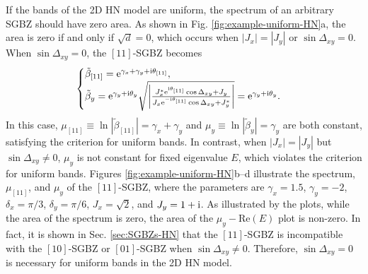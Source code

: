 If the bands of the 2D HN model are uniform, the spectrum of an arbitrary
SGBZ should have zero area. As shown in Fig. \ref{fig:example-uniform-HN}a,
the area is zero if and only if $\sqrt{d}=0$, which occurs when $|J_{x}|=|J_{y}|$
or $\sin\Delta_{xy}=0$. When $\sin\Delta_{xy}=0$, the $[11]$-SGBZ
becomes 
\begin{equation}
\begin{cases}
\tilde{\beta}_{[11]}=\mathrm{e}^{\gamma_{x}+\gamma_{y}+\mathrm{i}\theta_{[11]}},\\
\tilde{\beta}_{y}=\mathrm{e}^{\gamma_{y}+\mathrm{i}\theta_{y}}\sqrt{\left|\frac{J_{x}^{*}\mathrm{e}^{\mathrm{i}\theta_{[11]}}\cos\Delta_{xy}+J_{y}}{J_{x}\mathrm{e}^{-\mathrm{i}\theta_{[11]}}\cos\Delta_{xy}+J_{y}^{*}}\right|}=\mathrm{e}^{\gamma_{y}+\mathrm{i}\theta_{y}}.
\end{cases}
\end{equation}
In this case, $\mu_{[11]}\equiv\ln|\tilde{\beta}_{[11]}|=\gamma_{x}+\gamma_{y}$
and $\mu_{y}\equiv\ln|\tilde{\beta}_{y}|=\gamma_{y}$ are both constant,
satisfying the criterion for uniform bands. In contrast, when $|J_{x}|=|J_{y}|$
but $\sin\Delta_{xy}\neq0$, $\mu_{y}$ is not constant for fixed
eigenvalue $E$, which violates the criterion for uniform bands. Figures
\ref{fig:example-uniform-HN}b--d illustrate the spectrum, $\mu_{[11]}$,
and $\mu_{y}$ of the $[11]$-SGBZ, where the parameters are $\gamma_{x}=1.5$,
$\gamma_{y}=-2$, $\delta_{x}=\pi/3$, $\delta_{y}=\pi/6$, $J_{x}=\sqrt{2}$,
and $J_{y}=1+\mathrm{i}$. As illustrated by the plots, while the area of
the spectrum is zero, the area of the $\mu_{y}-\text{Re}(E)$ plot
is non-zero. In fact, it is shown in Sec. \ref{sec:SGBZs-HN} that
the $[11]$-SGBZ is incompatible with the $[10]$-SGBZ or $[01]$-SGBZ
when $\sin\Delta_{xy}\neq0$. Therefore, $\sin\Delta_{xy}=0$ is necessary
for uniform bands in the 2D HN model.

